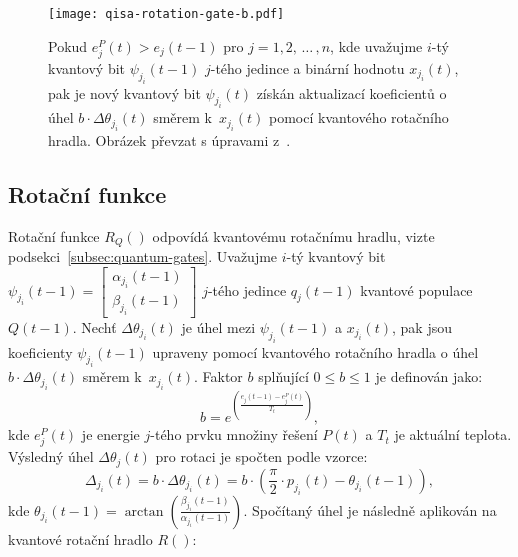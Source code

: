 \begin{figure}[ht!]
    \centering
    \texttt{[image: qisa-rotation-gate-b.pdf]}
    \caption{Pokud $e^P_j\left(t\right) > e_j\left(t-1\right)$ pro $j = 1,2,\,\dots\,,n$, kde uvažujme $i$-tý kvantový bit $\psi_{j_i}\left(t-1\right)$ $j$-tého jedince a binární hodnotu $x_{j_i} \left(t\right)$, pak je nový kvantový bit $\psi_{j_i}\left(t\right)$ získán aktualizací koeficientů o úhel $b \cdot \Delta\theta_{j_i}\left(t\right)$ směrem k~$x_{j_i}\left(t\right)$ pomocí kvantového rotačního hradla. Obrázek převzat s úpravami z~\cite{qisa}.}
    \label{fig:rotation-gate-b}
\end{figure}

\newpage
\subsection{Rotační funkce}\label{subsec:qisa-rot}
Rotační funkce $R_Q\left(\right)$ odpovídá kvantovému rotačnímu hradlu, vizte podsekci~\ref{subsec:quantum-gates}. 
Uvažujme $i$-tý kvantový bit $\psi_{j_i}\left(t-1\right) = \begin{bmatrix} \alpha_{j_i}\left(t-1\right) \\ \beta_{j_i}\left(t-1\right) \end{bmatrix}$ $j$-tého jedince $q_j\left(t-1\right)$ kvantové populace $Q\left(t-1\right)$. 
Nechť $\Delta\theta_{j_i}\left(t\right)$ je úhel mezi $\psi_{j_i}\left(t-1\right)$ a $x_{j_i}\left(t\right)$, pak jsou koeficienty $\psi_{j_i}\left(t-1\right)$ upraveny pomocí kvantového rotačního hradla o úhel $b \cdot \Delta\theta_{j_i}\left(t\right)$ směrem k~$x_{j_i}\left(t\right)$.
Faktor $b$ splňující $0 \leq b \leq 1$ je definován jako:
\begin{equation}\label{eq:b-factor}
    b = e^{\left(\frac{e_j\left(t-1\right) - e^P_j\left(t\right)}{T_t}\right)}, 
\end{equation}
kde $e^P_j\left(t\right)$ je energie $j$-tého prvku množiny řešení $P\left(t\right)$ a $T_t$ je aktuální teplota. Výsledný úhel $\Delta\theta_j\left(t\right)$ pro rotaci je spočten podle vzorce:
\begin{equation*}
        \Delta_{j_i}\left(t\right) = b \cdot \Delta\theta_{j_i}\left(t\right) = b \cdot \left(\frac{\pi}{2}\cdot p_{j_i}\left(t\right) - \theta_{j_i}\left(t-1\right)\right),
\end{equation*}
kde $\theta_{j_i}\left(t-1\right) = \arctan{\left(\frac{\beta_{j_i}\left(t-1\right)}{\alpha_{j_i}\left(t-1\right)}\right)}$. 
Spočítaný úhel je následně aplikován na kvantové rotační hradlo $R\left(\right)$:
